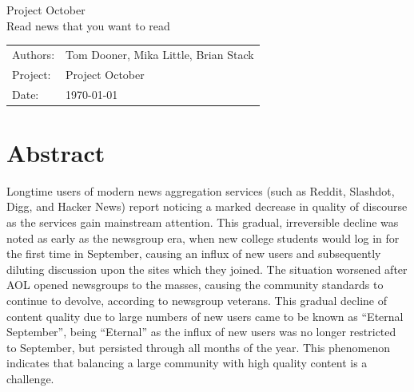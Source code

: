 \documentclass[11pt,letterpaper]{article}
\begin{document}

\newpage
\pagestyle{fancy}
\fancyhf{}
\vspace*{6cm}
\begin{center}
\Huge  {Project October}\\
\vspace{1cm}
\huge {Read news that you want to read}\\
\vspace{1cm}
\end{center}
\vfill
\begin{flushright}
\begin{tabular}{ll}
Authors: & Tom Dooner, Mika Little, Brian Stack\\
Project: & Project October\\
Date: & \today
\end{tabular}
\end{flushright}

\newpage
\pagestyle{fancy}
\fancyhf{}

\fancyhead[L]{\small \rm \textit{\rightmark}}
\fancyhead[R]{\small \rm \textbf{\thepage}}



\renewcommand{\sectionmark}[1]{\markright{\thesection.\ #1}}
\renewcommand{\headrulewidth}{0.5pt}
\renewcommand{\footrulewidth}{0.5pt}


\tableofcontents
\listoffigures

\newpage
\section{Abstract}

Longtime users of modern news aggregation services (such as Reddit, Slashdot, Digg, and Hacker News) report noticing a marked decrease in quality of discourse as the services gain mainstream attention.
This gradual, irreversible decline was noted as early as the newsgroup era, when new college students would log in for the first time in September, causing an influx of new users and subsequently diluting discussion upon the sites which they joined.
The situation worsened after AOL opened newsgroups to the masses, causing the community standards to continue to devolve, according to newsgroup veterans\cite{september}.
This gradual decline of content quality due to large numbers of new users came to be known as ``Eternal September'', being ``Eternal'' as the influx of new users was no longer restricted to September, but persisted through all months of the year. 
This phenomenon indicates that balancing a large community with high quality content is a challenge.
\end{document}
